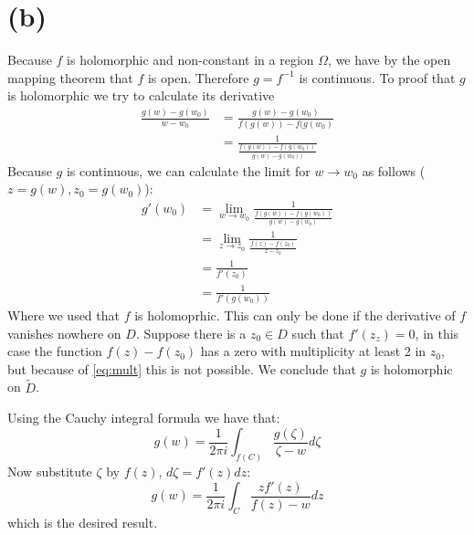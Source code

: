 \documentclass[a4paper, 11pt]{article}
\begin{document}
\section*{(b)}
Because $f$ is holomorphic and non-constant in a region $\Omega$, we have by the open mapping theorem that $f$ is open. Therefore $g=f^{-1}$ is continuous. 
To proof that $g$ is holomorphic we try to calculate its derivative
\begin{align*}
	\frac{g(w)-g(w_0)}{w-w_0} &= \frac{g(w)-g(w_0)}{f(g(w))-f(g(w_0)}\\
				  &= \frac{1}{ \frac{f(g(w))-f(g(w_0))}{g(w)-g(w_0))}}
\end{align*}
Because $g$ is continuous, we can calculate the limit for $w\rightarrow w_0$ as follows ($z=g(w), z_0=g(w_0)$):
\begin{align*}
	g'(w_0) &= \lim_{w\rightarrow w_0} \frac{1}{ \frac{f(g(w))-f(g(w_0))}{g(w)-g(w_0)}}\\
		&= \lim_{z\rightarrow z_0} \frac{1}{ \frac{f(z)-f(z_0)}{z-z_0}}\\
		&= \frac{1}{f'(z_0)}\\
		&= \frac{1}{f'(g(w_0))}
\end{align*}
Where we used that $f$ is holomoprhic. This can only be done if the derivative of $f$ vanishes nowhere on $D$. 
Suppose there is a $z_0\in D$ such that $f'(z_z)=0$, in this case the function $f(z)-f(z_0)$ has a zero with multiplicity at least 2 in $z_0$, but because of \autoref{eq:mult} this is not possible.
We conclude that $g$ is holomorphic on $\widetilde{D}$.

Using the Cauchy integral formula we have that:
\begin{equation*}
	g(w) = \frac{1}{2\pi i} \int_{f(C)}^{} \frac{g(\zeta)}{\zeta-w}d\zeta
\end{equation*}
Now substitute $\zeta$ by $f(z)$, $d\zeta = f'(z)dz$:
\begin{equation}
	g(w) = \frac{1}{2\pi i} \int_{C}^{} \frac{zf'(z)}{f(z)-w}dz
\end{equation}
which is the desired result.
\end{document}
